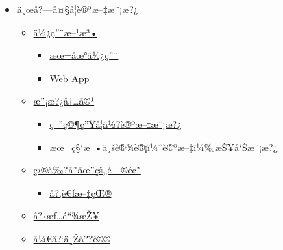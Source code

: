 \begin{itemize}
\tightlist
\item
  \href{https://github.com/typst/packages/raw/main/packages/preview/cheda-seu-thesis/0.3.0/\#\%E4\%B8\%9C\%E5\%8D\%97\%E5\%A4\%A7\%E5\%AD\%A6\%E8\%AE\%BA\%E6\%96\%87\%E6\%A8\%A1\%E6\%9D\%BF}{ä¸œå?---å¤§å­¦è®ºæ--‡æ¨¡æ?¿}

  \begin{itemize}
  \tightlist
  \item
    \href{https://github.com/typst/packages/raw/main/packages/preview/cheda-seu-thesis/0.3.0/\#\%E4\%BD\%BF\%E7\%94\%A8\%E6\%96\%B9\%E6\%B3\%95}{ä½¿ç''¨æ--¹æ³•}

    \begin{itemize}
    \tightlist
    \item
      \href{https://github.com/typst/packages/raw/main/packages/preview/cheda-seu-thesis/0.3.0/\#\%E6\%9C\%AC\%E5\%9C\%B0\%E4\%BD\%BF\%E7\%94\%A8}{æœ¬åœ°ä½¿ç''¨}
    \item
      \href{https://github.com/typst/packages/raw/main/packages/preview/cheda-seu-thesis/0.3.0/\#web-app}{Web
      App}
    \end{itemize}
  \item
    \href{https://github.com/typst/packages/raw/main/packages/preview/cheda-seu-thesis/0.3.0/\#\%E6\%A8\%A1\%E6\%9D\%BF\%E5\%86\%85\%E5\%AE\%B9}{æ¨¡æ?¿å†\ldots å®¹}

    \begin{itemize}
    \tightlist
    \item
      \href{https://github.com/typst/packages/raw/main/packages/preview/cheda-seu-thesis/0.3.0/\#\%E7\%A0\%94\%E7\%A9\%B6\%E7\%94\%9F\%E5\%AD\%A6\%E4\%BD\%8D\%E8\%AE\%BA\%E6\%96\%87\%E6\%A8\%A1\%E6\%9D\%BF}{ç~''ç©¶ç''Ÿå­¦ä½?è®ºæ--‡æ¨¡æ?¿}
    \item
      \href{https://github.com/typst/packages/raw/main/packages/preview/cheda-seu-thesis/0.3.0/\#\%E6\%9C\%AC\%E7\%A7\%91\%E6\%AF\%95\%E4\%B8\%9A\%E8\%AE\%BE\%E8\%AE\%A1\%E8\%AE\%BA\%E6\%96\%87\%E6\%8A\%A5\%E5\%91\%8A\%E6\%A8\%A1\%E6\%9D\%BF}{æœ¬ç§`æ¯•ä¸šè®¾è®¡ï¼ˆè®ºæ--‡ï¼‰æŠ¥å`Šæ¨¡æ?¿}
    \end{itemize}
  \item
    \href{https://github.com/typst/packages/raw/main/packages/preview/cheda-seu-thesis/0.3.0/\#\%E7\%9B\%AE\%E5\%89\%8D\%E5\%AD\%98\%E5\%9C\%A8\%E7\%9A\%84\%E9\%97\%AE\%E9\%A2\%98}{ç›®å‰?å­˜åœ¨çš„é---®é¢˜}

    \begin{itemize}
    \tightlist
    \item
      \href{https://github.com/typst/packages/raw/main/packages/preview/cheda-seu-thesis/0.3.0/\#\%E5\%8F\%82\%E8\%80\%83\%E6\%96\%87\%E7\%8C\%AE}{å?‚è€ƒæ--‡çŒ®}
    \end{itemize}
  \item
    \href{https://github.com/typst/packages/raw/main/packages/preview/cheda-seu-thesis/0.3.0/\#\%E5\%8F\%8B\%E6\%83\%85\%E9\%93\%BE\%E6\%8E\%A5}{å?‹æƒ\ldots é``¾æŽ¥}
  \item
    \href{https://github.com/typst/packages/raw/main/packages/preview/cheda-seu-thesis/0.3.0/\#\%E5\%BC\%80\%E5\%8F\%91\%E4\%B8\%8E\%E5\%8D\%8F\%E8\%AE\%AE}{å¼€å?{}`ä¸Žå??è®®}


\end{itemize}
\end{itemize}
